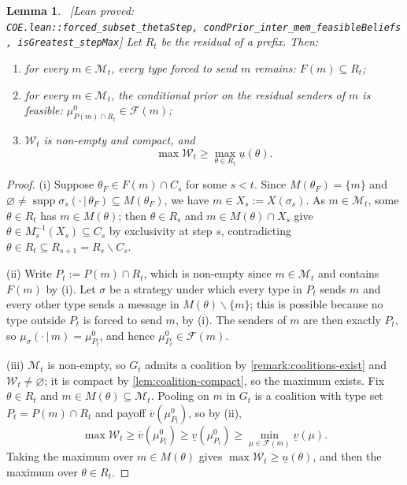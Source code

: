 \documentclass[11pt]{article}
\newtheorem{lemma}{Lemma}
\newcommand{\sep}{\,|\,}
\newcommand{\supp}{\operatorname{supp}}
\newcommand{\Msg}{\mathcal{M}}
\newcommand{\W}{\mathcal{W}}
\newcommand{\leanproved}[1]{{\footnotesize\textsf{\textcolor{green!55!black}{[Lean proved: \texttt{#1}]}}}}
\begin{document}
\begin{lemma}\label{lem:remaining-games}\ \leanproved{COE.lean::forced\_subset\_thetaStep,\ condPrior\_inter\_mem\_feasibleBeliefs,\ isGreatest\_stepMax}
    Let $R_t$ be the residual of a prefix. Then:
    \begin{enumerate}
        \item[(i)] for every $m\in\Msg_t$, every type forced to send $m$ remains: $F(m)\subseteq R_t$;
        \item[(ii)] for every $m\in\Msg_t$, the conditional prior on the residual senders of $m$ is feasible: $\mu^0_{P(m)\cap R_t}\in\mathcal{F}(m)$;
        \item[(iii)] $\W_t$ is non-empty and compact, and
        \[
            \max\W_t\geq\max_{\theta\in R_t}\underline{u}(\theta).
        \]
    \end{enumerate}
\end{lemma}
\begin{proof}
    (i) Suppose $\theta_F\in F(m)\cap C_s$ for some $s<t$. Since $M(\theta_F)=\{m\}$ and $\varnothing\neq\supp\sigma_s(\cdot\sep\theta_F)\subseteq M(\theta_F)$, we have $m\in X_s:=X(\sigma_s)$. As $m\in\Msg_t$, some $\theta\in R_t$ has $m\in M(\theta)$; then $\theta\in R_s$ and $m\in M(\theta)\cap X_s$ give $\theta\in M^{-1}_s(X_s)\subseteq C_s$ by exclusivity at step $s$, contradicting $\theta\in R_t\subseteq R_{s+1}=R_s\smallsetminus C_s$.

    (ii) Write $P_t:=P(m)\cap R_t$, which is non-empty since $m\in\Msg_t$ and contains $F(m)$ by (i). Let $\sigma$ be a strategy under which every type in $P_t$ sends $m$ and every other type sends a message in $M(\theta)\smallsetminus\{m\}$; this is possible because no type outside $P_t$ is forced to send $m$, by (i). The senders of $m$ are then exactly $P_t$, so $\mu_\sigma(\cdot\sep m)=\mu^0_{P_t}$, and hence $\mu^0_{P_t}\in\mathcal{F}(m)$.

    (iii) $\Msg_t$ is non-empty, so $G_t$ admits a coalition by \cref{remark:coalitions-exist} and $\W_t\neq\varnothing$; it is compact by \cref{lem:coalition-compact}, so the maximum exists. Fix $\theta\in R_t$ and $m\in M(\theta)\subseteq\Msg_t$. Pooling on $m$ in $G_t$ is a coalition with type set $P_t=P(m)\cap R_t$ and payoff $\overline{v}(\mu^0_{P_t})$, so by (ii),
    \[
        \max\W_t\geq\overline{v}(\mu^0_{P_t})\geq\underline{v}(\mu^0_{P_t})\geq\min_{\mu\in\mathcal{F}(m)}\underline{v}(\mu).
    \]
    Taking the maximum over $m\in M(\theta)$ gives $\max\W_t\geq\underline{u}(\theta)$, and then the maximum over $\theta\in R_t$.
\end{proof}
\end{document}
